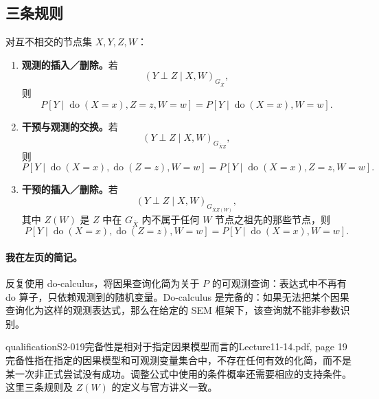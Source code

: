 \subsection{三条规则}
对互不相交的节点集 $X,Y,Z,W$：
\begin{enumerate}
 \item \textbf{观测的插入／删除。}若
 \[(Y\perp Z\mid X,W)_{G_{\overline X}},\]
 则
 \[
 P[Y\mid\operatorname{do}(X=x),Z=z,W=w]
 =P[Y\mid\operatorname{do}(X=x),W=w].
 \]
 \item \textbf{干预与观测的交换。}若
 \[(Y\perp Z\mid X,W)_{G_{\overline X\underline Z}},\]
 则
 \[
 P[Y\mid\operatorname{do}(X=x),\operatorname{do}(Z=z),W=w]
 =P[Y\mid\operatorname{do}(X=x),Z=z,W=w].
 \]
 \item \textbf{干预的插入／删除。}若
 \[(Y\perp Z\mid X,W)_{G_{\overline X\overline{Z(W)}}},\]
 其中 $Z(W)$ 是 $Z$ 中在 $G_{\overline X}$ 内不属于任何 $W$ 节点之祖先的那些节点，则
 \[
 P[Y\mid\operatorname{do}(X=x),\operatorname{do}(Z=z),W=w]
 =P[Y\mid\operatorname{do}(X=x),W=w].
 \]
\end{enumerate}
\paragraph{我在左页的简记。}

反复使用 do-calculus，将因果查询化简为关于 $P$ 的可观测查询：表达式中不再有 do 算子，只依赖观测到的随机变量。Do-calculus 是完备的：如果无法把某个因果查询化为这样的观测表达式，那么在给定的 SEM 框架下，该查询就不能非参数识别。

\begin{reviewnote}{qualification}{S2-019}{完备性是相对于指定因果模型而言的}{Lecture11-14.pdf, page 19}
完备性指在指定的因果模型和可观测变量集合中，不存在任何有效的化简，而不是某一次非正式尝试没有成功。调整公式中使用的条件概率还需要相应的支持条件。这里三条规则及 $Z(W)$ 的定义与官方讲义一致。
\end{reviewnote}


